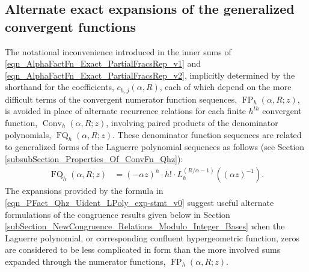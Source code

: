 \documentclass[12pt,reqno]{article}
\numberwithin{sfootnote}{section}
\numberwithin{equation}{section}
\theoremstyle{DefaultTheoremStyle}
\theoremstyle{definition}
\newcommand{\ConvGF}[4]{\ensuremath{\Conv_{#1}\left(#2, #3; #4\right)}}
\DeclareMathOperator{\FP}{FP}
\DeclareMathOperator{\FQ}{FQ}
\DeclareMathOperator{\Conv}{Conv}
\begin{document}
\subsection{Alternate exact expansions of the generalized convergent functions} 
\label{subSection_AltExps_of_the_GenConvFns} 

The notational inconvenience introduced in the inner sums of 
\eqref{eqn_AlphaFactFn_Exact_PartialFracsRep_v1} and 
\eqref{eqn_AlphaFactFn_Exact_PartialFracsRep_v2}, 
implicitly determined by the shorthand for the coefficients, 
$c_{h,j}(\alpha, R)$, 
each of which depend on the more difficult terms of the 
convergent numerator function sequences, $\FP_h(\alpha, R; z)$, 
is avoided in place of alternate recurrence relations for each 
finite $h^{th}$ convergent function, $\ConvGF{h}{\alpha}{R}{z}$, 
involving paired products of the 
denominator polynomials, $\FQ_h(\alpha, R; z)$. 
These denominator function sequences are related to generalized forms of the 
Laguerre polynomial sequences as follows 
(see Section \ref{subsubSection_Properties_Of_ConvFn_Qhz}): 
\begin{align} 
\label{eqn_PFact_Qhz_Uident_LPoly_exp-stmt_v0} 
\FQ_h(\alpha, R; z) & = 
     (-\alpha z)^{h} \cdot h! \cdot 
     L_h^{(R / \alpha - 1)}\left((\alpha z)^{-1}\right). 
\end{align} 
The expansions provided by the formula in 
\eqref{eqn_PFact_Qhz_Uident_LPoly_exp-stmt_v0} 
suggest useful alternate formulations of the 
congruence results given below in 
Section \ref{subSection_NewCongruence_Relations_Modulo_Integer_Bases} 
when the Laguerre polynomial, or corresponding 
confluent hypergeometric function, zeros 
are considered to be less complicated in form than the 
more involved sums expanded through the numerator functions, 
$\FP_h(\alpha, R; z)$. 
\end{document}

